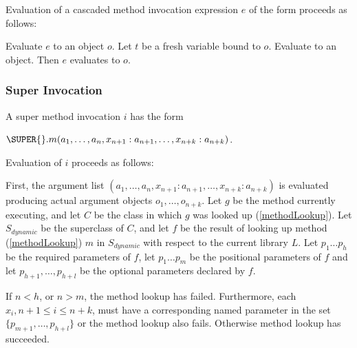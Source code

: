 \documentclass{article}
\begin{document}
\LMHash{}
Evaluation of a cascaded method invocation expression $e$ of the form  proceeds as follows:

Evaluate $e$ to an object $o$.
Let $t$ be a fresh variable bound to $o$.
Evaluate  to an object.
Then $e$ evaluates to $o$.



\subsubsection{Super Invocation}

\LMHash{}
A super method invocation $i$ has the form

$\SUPER{}.m(a_1, \ldots , a_n, x_{n+1}: a_{n+1}, \ldots , x_{n+k}: a_{n+k})$.

\LMHash{}
Evaluation of $i$ proceeds as follows:

\LMHash{}
First, the argument list $(a_1, \ldots , a_n, x_{n+1}: a_{n+1}, \ldots , x_{n+k}: a_{n+k})$ is evaluated producing actual argument objects $o_1, \ldots , o_{n+k}$.
Let $g$ be the method currently executing, and let $C$ be the class in which $g$ was looked up (\ref{methodLookup}).
Let $S_{dynamic}$ be the superclass of $C$, and let $f$ be the result of looking up method (\ref{methodLookup}) $m$ in $S_{dynamic}$ with respect to the current library $L$.
Let $p_1 \ldots p_h$ be the required parameters of $f$, let $p_1 \ldots p_m$ be the positional parameters of $f$ and let $p_{h+1}, \ldots, p_{h+l}$ be the optional parameters declared by $f$.

\LMHash{}
If $n < h$, or $n > m$, the method lookup has failed.
Furthermore, each $x_i, n+1 \le i \le n+k$, must have a corresponding named parameter in the set $\{p_{m+1}, \ldots, p_{h+l}\}$ or the method lookup also fails.
Otherwise method lookup has succeeded.
\end{document}
